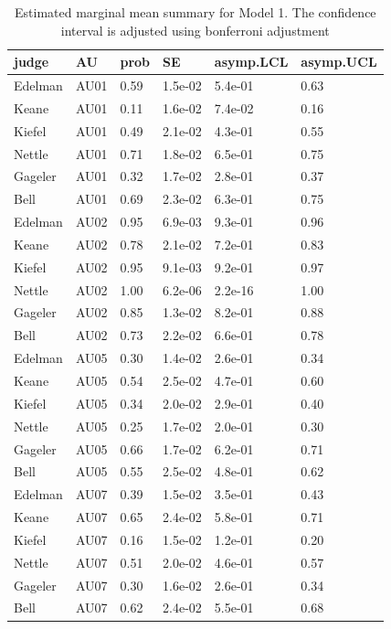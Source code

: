 \documentclass{monashthesis}
\begin{document}
\begin{table}[ht]
\begin{center}
\caption{\label{tab:result_1}Estimated marginal mean summary for Model 1. The confidence interval is adjusted using bonferroni adjustment}
\begin{tabular}{llllll}
\toprule
judge & AU & prob & SE & asymp.LCL & asymp.UCL \\
\midrule
Edelman & AU01 & 0.59 & 1.5e-02 & 5.4e-01 & 0.63 \\
Keane & AU01 & 0.11 & 1.6e-02 & 7.4e-02 & 0.16 \\
Kiefel & AU01 & 0.49 & 2.1e-02 & 4.3e-01 & 0.55 \\
Nettle & AU01 & 0.71 & 1.8e-02 & 6.5e-01 & 0.75 \\
Gageler & AU01 & 0.32 & 1.7e-02 & 2.8e-01 & 0.37 \\
Bell & AU01 & 0.69 & 2.3e-02 & 6.3e-01 & 0.75 \\
Edelman & AU02 & 0.95 & 6.9e-03 & 9.3e-01 & 0.96 \\
Keane & AU02 & 0.78 & 2.1e-02 & 7.2e-01 & 0.83 \\
Kiefel & AU02 & 0.95 & 9.1e-03 & 9.2e-01 & 0.97 \\
Nettle & AU02 & 1.00 & 6.2e-06 & 2.2e-16 & 1.00 \\
Gageler & AU02 & 0.85 & 1.3e-02 & 8.2e-01 & 0.88 \\
Bell & AU02 & 0.73 & 2.2e-02 & 6.6e-01 & 0.78 \\
Edelman & AU05 & 0.30 & 1.4e-02 & 2.6e-01 & 0.34 \\
Keane & AU05 & 0.54 & 2.5e-02 & 4.7e-01 & 0.60 \\
Kiefel & AU05 & 0.34 & 2.0e-02 & 2.9e-01 & 0.40 \\
Nettle & AU05 & 0.25 & 1.7e-02 & 2.0e-01 & 0.30 \\
Gageler & AU05 & 0.66 & 1.7e-02 & 6.2e-01 & 0.71 \\
Bell & AU05 & 0.55 & 2.5e-02 & 4.8e-01 & 0.62 \\
Edelman & AU07 & 0.39 & 1.5e-02 & 3.5e-01 & 0.43 \\
Keane & AU07 & 0.65 & 2.4e-02 & 5.8e-01 & 0.71 \\
Kiefel & AU07 & 0.16 & 1.5e-02 & 1.2e-01 & 0.20 \\
Nettle & AU07 & 0.51 & 2.0e-02 & 4.6e-01 & 0.57 \\
Gageler & AU07 & 0.30 & 1.6e-02 & 2.6e-01 & 0.34 \\
Bell & AU07 & 0.62 & 2.4e-02 & 5.5e-01 & 0.68 \\

\end{tabular}
\end{center}
\end{table}
\end{document}
